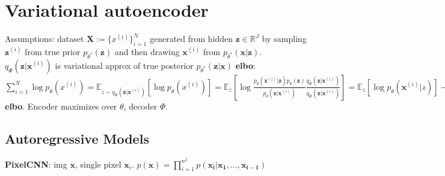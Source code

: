 \section{Variational autoencoder}
Assumptions: dataset $\mathbf{X}:= \{x^{(i)}\}_{i=1}^N$ generated from hidden $\mathbf{z} \in \mathbb{R}^J$ by sampling $\mathbf{z}^{(i)}$ from true prior $p_{\theta^*}(\mathbf{z})$ and then drawing $\mathbf{x}^{(i)}$ from $p_{\theta^*}(\mathbf{x} | \mathbf{z})$. $q_\Phi(\mathbf{z}|\mathbf{x}^{(i)})$ is variational approx of true posterior $p_{\theta^*}(\mathbf{z} | \mathbf{x})$ \textbf{elbo}: $\sum_{i=1}^N\log{p_\theta(x^{(i)})}=\mathbb{E}_{z \sim q_\Phi(\mathbf{z}|\mathbf{x}^{(i)})}[\log{p_\theta(x^{(i)})}] = \mathbb{E}_z[\log{\frac{p_{\theta}(\mathbf{x}^{(i)} | \mathbf{z})p_{\theta}(\mathbf{z})}{p_{\theta}(\mathbf{z} | \mathbf{x}^{(i)})}\frac{q_\Phi(\mathbf{z}|\mathbf{x}^{(i)})}{q_\Phi(\mathbf{z}|\mathbf{x}^{(i)})}}] = \mathbb{E}_z[\log{p_{\theta}(\mathbf{x}^{(i)}|z)}] - \mathbb{E}_z[\log{\frac{q_\Phi(\mathbf{z}|\mathbf{x}^{(i)})}{p_{\theta}(\mathbf{z})}}] + \mathbb{E}_z[\log{\frac{q_\Phi(\mathbf{z}|\mathbf{x}^{(i)})}{p_{\theta}(\mathbf{z}|\mathbf{x}^{(i)})}}] = \mathbb{E}_z[\log{p_{\theta}(\mathbf{x}^{(i)}|z)}] - D_{KL}({q_\Phi(\mathbf{z}|\mathbf{x}^{(i)})}||{p_{\theta}(\mathbf{z})}) + D_{KL}({q_\Phi(\mathbf{z}|\mathbf{x}^{(i)})}||{p_{\theta}(\mathbf{z}|\mathbf{x}^{(i)})}) \geq \mathbb{E}_z[\log{p_{\theta}(\mathbf{x}^{(i)}|z)}] - D_{KL}({q_\Phi(\mathbf{z}|\mathbf{x}^{(i)})}||{p_{\theta}(\mathbf{z})}) = $ \textbf{elbo}. Encoder maximizes over $\theta$, decoder $\Phi$.

\subsection*{Autoregressive Models}
\textbf{PixelCNN}: img $\mathbf{x}$, single pixel $\mathbf{x}_i$. $p(\mathbf{x}) = \prod_{i=1}^{n^2}p(\mathbf{x_i}|\mathbf{x_1}, ..., \mathbf{x_{i-1}})$
